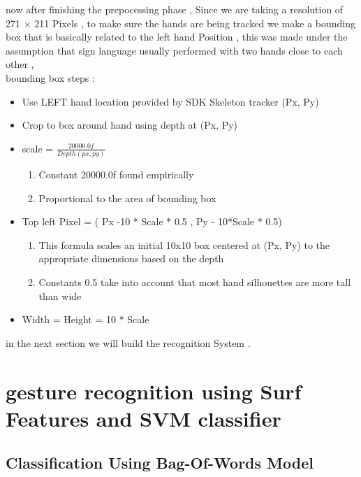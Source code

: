 now after finishing  the prepocessing phase , Since we are taking a resolution of 271 $\times$ 211 Pixels , to make sure the hands are being tracked we make a bounding box that is basically related to the left hand Position , this was made under the assumption that sign language  usually performed with two hands close to each other , \\
bounding box steps : \\

\begin{itemize}
\item  Use LEFT hand location provided by SDK Skeleton  tracker (Px, Py)
 \item Crop to box around hand using depth at (Px, Py)
    \item scale = $\frac{20000.0f}{Depth(px,py)}$ 
    \begin{enumerate}
    \item Constant 20000.0f  found empirically
    \item Proportional to the area of bounding box 
    \end{enumerate}
\item Top left Pixel  = ( Px -10 * Scale * 0.5  , Py - 10*Scale * 0.5)
\begin{enumerate}
    \item This formula scales an initial 10x10 box centered at (Px, Py) to
the appropriate dimensions based on the depth 
    \item Constants 0.5  take into account that most hand
silhouettes are more tall than wide 
    \end{enumerate}
   \item Width = Height = 10 * Scale 
\end{itemize}
\newline
in the next section we will build the recognition System  .


\section{ gesture recognition using Surf  Features  and SVM  classifier }

\subsection{ Classification Using Bag-Of-Words Model}

